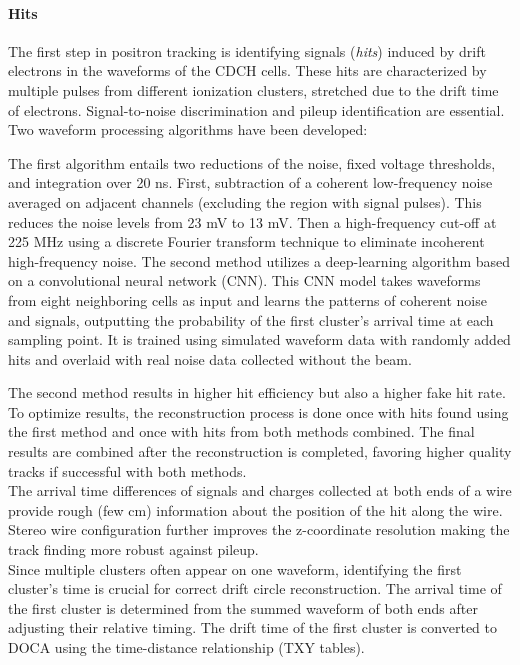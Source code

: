 \begin{refsection}
        \paragraph{Hits} The first step in positron tracking is identifying signals (\textit{hits}) induced by drift electrons in the waveforms of the CDCH cells.
        These hits are characterized by multiple pulses from different ionization clusters, stretched due to the drift time of electrons.
        Signal-to-noise discrimination and pileup identification are essential. 
        Two waveform processing algorithms have been developed:
        \begin{outline}
            \1 The first algorithm entails two reductions of the noise, fixed voltage thresholds, and integration over 20 ns.
            First, subtraction of a coherent low-frequency noise averaged on adjacent channels (excluding the region with signal pulses).
            This reduces the noise levels from 23 mV to 13 mV.
            Then a high-frequency cut-off at 225 MHz using a discrete Fourier transform technique to eliminate incoherent high-frequency noise.
            \1 The second method utilizes a deep-learning algorithm based on a convolutional neural network (CNN). This CNN model takes waveforms from eight neighboring cells as input and learns the patterns of coherent noise and signals, outputting the probability of the first cluster's arrival time at each sampling point. It is trained using simulated waveform data with randomly added hits and overlaid with real noise data collected without the beam.
        \end{outline}
        
        \noindent
        The second method results in higher hit efficiency but also a higher fake hit rate. 
        To optimize results, the reconstruction process is done once with hits found using the first method and once with hits from both methods combined. 
        The final results are combined after the reconstruction is completed, favoring higher quality tracks if successful with both methods. \\
        The arrival time differences of signals and charges collected at both ends of a wire provide rough (few cm) information about the position of the hit along the wire. 
        Stereo wire configuration further improves the z-coordinate resolution making the track finding more robust against pileup. \\
        Since multiple clusters often appear on one waveform, identifying the first cluster's time is crucial for correct drift circle reconstruction. 
        The arrival time of the first cluster is determined from the summed waveform of both ends after adjusting their relative timing. 
        The drift time of the first cluster is converted to DOCA using the time-distance relationship (TXY tables).


\end{refsection}
